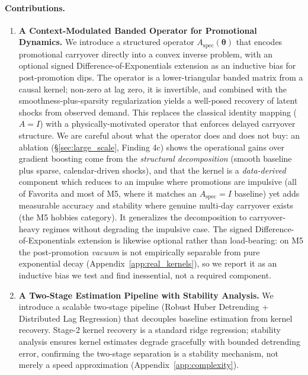 \documentclass[10pt]{article} %
\theoremstyle{plain}
\theoremstyle{definition}
\newcommand{\Aspec}{A_{\text{spec}}}
\begin{document}
\paragraph{Contributions.}
\begin{enumerate}
  \item \textbf{A Context-Modulated Banded Operator for Promotional Dynamics.} We introduce a structured operator $\Aspec(\boldsymbol{\theta})$ that encodes promotional carryover directly into a convex inverse problem, with an optional signed Difference-of-Exponentials extension as an inductive bias for post-promotion dips. The operator is a lower-triangular banded matrix from a causal kernel; non-zero at lag zero, it is invertible, and combined with the smoothness-plus-sparsity regularization yields a well-posed recovery of latent shocks from observed demand. This replaces the classical identity mapping ($A = I$) with a physically-motivated operator that enforces delayed carryover structure. We are careful about what the operator does and does not buy: an ablation (\S\ref{sec:large_scale}, Finding 4c) shows the operational gains over gradient boosting come from the \emph{structural decomposition} (smooth baseline plus sparse, calendar-driven shocks), and that the kernel is a \emph{data-derived} component which reduces to an impulse where promotions are impulsive (all of Favorita and most of M5, where it matches an $\Aspec=I$ baseline) yet adds measurable accuracy and stability where genuine multi-day carryover exists (the M5 hobbies category). It generalizes the decomposition to carryover-heavy regimes without degrading the impulsive case. The signed Difference-of-Exponentials extension is likewise optional rather than load-bearing: on M5 the post-promotion \emph{vacuum} is not empirically separable from pure exponential decay (Appendix~\ref{app:real_kernels}), so we report it as an inductive bias we test and find inessential, not a required component.
  
  \item \textbf{A Two-Stage Estimation Pipeline with Stability Analysis.} We introduce a scalable two-stage pipeline (Robust Huber Detrending + Distributed Lag Regression) that decouples baseline estimation from kernel recovery. Stage-2 kernel recovery is a standard ridge regression; stability analysis ensures kernel estimates degrade gracefully with bounded detrending error, confirming the two-stage separation is a stability mechanism, not merely a speed approximation (Appendix~\ref{app:complexity}).
  

\end{enumerate}
\end{document}
